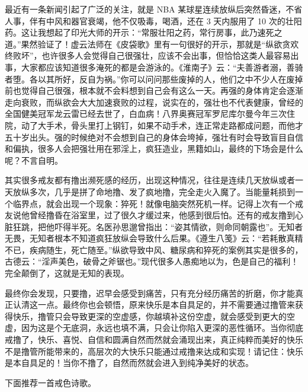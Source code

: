 最近有一条新闻引起了广泛的关注，就是 NBA 某球星连续放纵后突然昏迷，不省人事，伴有中风和器官衰竭，他不仅吸毒，喝酒，还在 3 天内服用了 10 次的壮阳药。这让我想起了印光大师的开示：“常服壮阳之药，常行房事，此乃速死之道。”果然验证了！虚云法师在《皮袋歌》里有一句很好的开示，那就是“纵欲贪欢终败坏”，也许很多人会觉得自己很强壮，应该不会出事，但恰恰这类人最容易出事，大家都应该知道很多淹死的都是会游泳的。《淮南子》云：“夫善游者溺，善骑者堕。各以其所好，反自为祸。”你可以问问那些废掉的人，他们之中不少人在废掉前也觉得自己很强，根本就不会料想到自己会有这么一天。再强的身体肯定会逐渐走向衰败，而纵欲会大大加速衰败的过程，说实在的，强壮也不代表健康，曾经的全国健美冠军龙云雷已经去世了，白血病！八界奥赛冠军罗尼库尔曼今年三次住院，动了大手术，骨头里打上钢钉，如果不动手术，连正常走路都成问题，而他才五十岁出头。强的时候绝对不会想到自己的身体会垮掉，强壮有时会导致盲目自信和偏执，很多人会把强壮用在邪淫上，疯狂造业，黑籍如山，最终的下场会是什么呢？不言自明。

其实很多戒友都有撸出濒死感的经历，出现这种情况，往往是连续几天放纵或者一天放纵多次，几乎是拼了命地撸、发了疯地撸，完全走火入魔了。当能量耗损到一个临界点，就会出现一个现象：猝死！就像电脑突然死机一样。记得上次有一个戒友说他曾经撸昏在浴室里，过了很久才缓过来，他感到很后怕。还有的戒友撸到心脏狂跳，把他吓得半死。名医孙思邈曾指出：“姿其情欲，则命同朝露也”。无知者无畏，无知者根本不知道疯狂放纵会导致什么后果。《遵生八笺》云：“若耗散真精不已，疾病随生，死亡随至。”纵欲导致中风、糖尿病和猝死的案例其实是很多的，古德云：“淫声美色，破骨之斧锯也。”现代很多人愚痴地以为，色是自己的福利！完全颠倒了，这就是无知的表现。

最终你会发现，只要撸，迟早会感受到痛苦，只有充分经历痛苦的折磨，你才能真正认清这一点。最终你也会顿悟，原来快乐是本自具足的，并不需要通过撸管来获得快乐，撸管只会导致更深的空虚感，你越填补这份空虚，就会感受到更大的空虚，因为这是个无底洞，永远也填不满，只会让你陷入更深的恶性循环。当你彻底戒撸了，快乐、喜悦、自信和圆满自然而然就会涌现出来，真正纯粹而美好的快乐不是撸管所能带来的，高层次的大快乐只能通过戒撸来达成和实现！请记住：快乐是本自具足的！当你不撸了，自然而然就会进入到纯净美好的状态。

下面推荐一首戒色诗歌。

